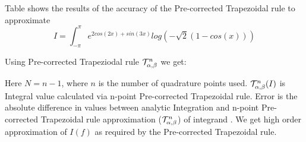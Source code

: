 \documentclass[../document.tex]{subfiles}
\begin{document}
	
	
	\begin{examp}
		Table shows the results of the accuracy of the  Pre-corrected Trapezoidal rule
		to approximate  
		\begin{equation} \label{example2}
		I =	\int_{-\pi}^{\pi}   e^{2cos(2x) + sin(3x)} log(-\sqrt{2}(1-cos(x)) )
		\end{equation}  
		
		Using Pre-corrected Trapeziodal rule $ \mathcal{T}_{\alpha,\beta}^{n} $ we get:
		
		\begin{table}[h]
			
				\caption{ 	Error report  of Precorrected Trapezoidal rule approximation for Integral-\eqref{example2} }
			
			
			
		\end{table}
		Here $N=n-1$, where $n$ is the number of quadrature points used. $\mathcal{T}_{\alpha,\beta}^{n}(I)$  is Integral value calculated via n-point Pre-corrected Trapezoidal rule. Error is the absolute difference in values between analytic Integration and n-point Pre-corrected Trapezoidal rule approximation ($\mathcal{T}_{\alpha,\beta}^{n}$) of integrand .
		We get high order approximation of $I(f)$ as required by the Pre-corrected  Trapezoidal rule.
		
		
	\end{examp}		
	
\end{document}
